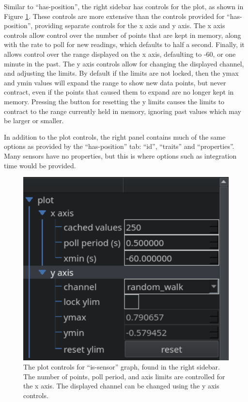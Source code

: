 Similar to ``has-position'', the right sidebar has controls for the plot, as shown in Figure \ref{yaq:fig:is_sensor_plot_controls}.
These controls are more extensive than the controls provided for ``has-position'', providing separate controls for the x axis and y axis.
The x axis controls allow control over the number of points that are kept in memory, along with the rate to poll for new readings, which defaults to half a second.
Finally, it allows control over the range displayed on the x axis, defaulting to -60, or one minute in the past.
The y axis controls allow for changing the displayed channel, and adjusting the limits.
By default if the limits are not locked, then the ymax and ymin values will expand the range to show new data points, but never contract, even if the points that caused them to expand are no longer kept in memory.
Pressing the button for resetting the y limits causes the limits to contract to the range currently held in memory, ignoring past values which may be larger or smaller.


In addition to the plot controls, the right panel contains much of the same options as provided by the ``has-position'' tab: ``id'', ``traits'' and ``properties''.
Many sensors have no properties, but this is where options such as integration time would be provided.

\begin{figure}
\includegraphics[width=4.5in]{"yaq/images/is_sensor_plot_controls"}
\caption[\yaqcqtpy{} is-sensor Plot Controls]{
	The plot controls for ``is-sensor'' graph, found in the right sidebar.
	The number of points, poll period, and axis limits are controlled for the x axis.
	The displayed channel can be changed using the y axis controls.
}
\label{yaq:fig:is_sensor_plot_controls}
\end{figure}

